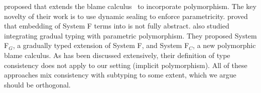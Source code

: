 \citet{ahmed2011blame} proposed \pbc that
extends the blame calculus~\cite{Wadler_2009} to incorporate polymorphism. The
key novelty of their work is to use dynamic sealing to enforce parametricity.
\citet{devriese2017parametricity} proved that embedding of System F terms into
\pbc is not fully abstract.
\citet{yuu2017poly} also studied integrating
gradual typing with parametric polymorphism. They proposed System F$_G$, a
gradually typed extension of System F, and System F$_C$, a new polymorphic blame
calculus. As has been discussed extensively, their definition of type consistency
does not apply to our setting (implicit polymorphism). All of these approaches mix consistency with
subtyping to some extent, which we argue should be orthogonal.



